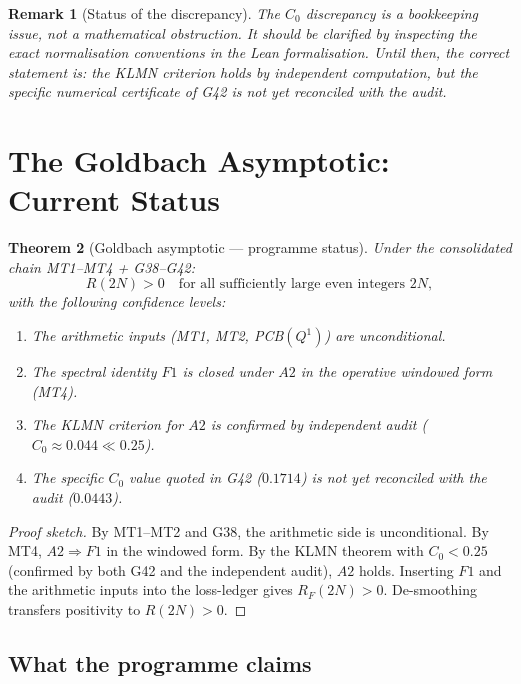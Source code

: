 \documentclass[11pt,a4paper]{article}
\newtheorem{theorem}{Theorem}[section]
\newtheorem{remark}[theorem]{Remark}
\begin{document}
\begin{remark}[Status of the discrepancy]
The $C_0$ discrepancy is a bookkeeping issue, not a mathematical obstruction.  It should be clarified by inspecting the exact normalisation conventions in the Lean formalisation.  Until then, the correct statement is: the KLMN criterion holds by independent computation, but the specific numerical certificate of G42 is not yet reconciled with the audit.
\end{remark}

\section{The Goldbach Asymptotic: Current Status}

\begin{theorem}[Goldbach asymptotic --- programme status]
\label{thm:goldbach-status}
Under the consolidated chain MT1--MT4 + G38--G42:
\[
R(2N)>0 \quad\text{for all sufficiently large even integers } 2N,
\]
with the following confidence levels:
\begin{enumerate}[nosep]
    \item The arithmetic inputs (MT1, MT2, PCB$(Q^1)$) are unconditional.
    \item The spectral identity $F1$ is closed under $A2$ in the operative windowed form (MT4).
    \item The KLMN criterion for $A2$ is confirmed by independent audit ($C_0\approx 0.044 \ll 0.25$).
    \item The specific $C_0$ value quoted in G42 ($0.1714$) is not yet reconciled with the audit ($0.0443$).
\end{enumerate}
\end{theorem}

\begin{proof}[Proof sketch]
By MT1--MT2 and G38, the arithmetic side is unconditional.  By MT4, $A2\Rightarrow F1$ in the windowed form.  By the KLMN theorem with $C_0<0.25$ (confirmed by both G42 and the independent audit), $A2$ holds.  Inserting $F1$ and the arithmetic inputs into the loss-ledger gives $R_F(2N)>0$.  De-smoothing transfers positivity to $R(2N)>0$.
\end{proof}

\subsection{What the programme claims}
\end{document}
